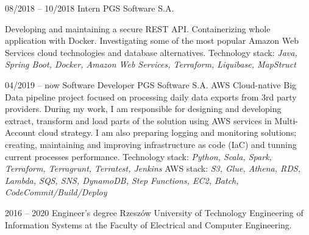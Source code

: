 \documentclass[9pt]{developercv} %
\begin{document}


\begin{entrylist}
	\entry
	{08/2018 -- 10/2018}
	{Intern}
	{PGS Software S.A.}
	{Developing and maintaining a secure REST API. Containerizing whole application with Docker. Investigating some of the most popular Amazon Web Services cloud technologies and database alternatives.
		\vspace{0.1cm}\newline
		Technology stack: \textit{Java, Spring Boot, Docker, Amazon Web Services, Terraform, Liquibase, MapStruct}
		
	}
			
			
	\entry
	{04/2019 -- now}
	{Software Developer}
	{PGS Software S.A.}
	{AWS Cloud-native Big Data pipeline project focused on processing daily data exports from 3rd party providers. During my work, I am responsible for designing and developing extract, transform and load parts of the solution using AWS services in Multi-Account cloud strategy. I am also preparing logging and monitoring solutions; creating, maintaining and improving infrastructure as code (IaC) and tunning current processes performance.
		\vspace{0.1cm}\newline
		Technology stack: \textit{Python, Scala, Spark, Terraform, Terragrunt, Terratest, Jenkins}
		\vspace{0.05cm}\newline
		AWS stack: \textit{S3, Glue, Athena, RDS, Lambda, SQS, SNS, DynamoDB, Step Functions, EC2, Batch, CodeCommit/Build/Deploy}
	}
	
	
	
	
\end{entrylist}



\begin{entrylist}
	\entry
	{2016 -- 2020}
	{Engineer's degree}
	{Rzeszów University of Technology}
	{Engineering of Information Systems at the Faculty of Electrical and Computer Engineering.}
\end{entrylist}
\end{document}
